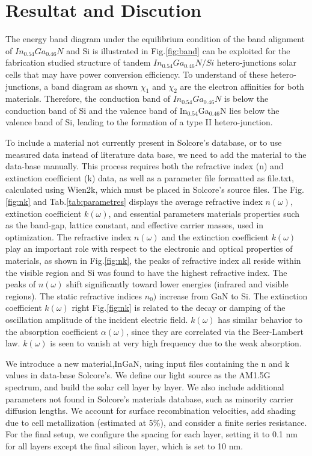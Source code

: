 \documentclass[preprint,12pt]{elsarticle}
\begin{document}
\section{Resultat and Discution} \label{sec:R_D}
The energy band diagram under the equilibrium condition of the band alignment of $In_{0.54}Ga_{0.46}N$ and Si is illustrated in Fig.\ref{fig:band} can be exploited for the fabrication studied structure of tandem $In_{0.54}Ga_{0.46}N/Si$ hetero-junctions solar cells that may have power conversion efficiency. To understand of these hetero-junctions, a band diagram as shown $ \chi_{1}$ and $ \chi_{2}$ are the electron affinities for both materials. Therefore, the conduction band of $In_{0.54}Ga_{0.46}N$ is below the conduction band of Si and the valence band of In$_{0.54}$Ga$_{0.46}$N lies below the valence band of Si, leading to the formation of a type II hetero-junction. 

To include a material not currently present in Solcore's database, or to use measured data instead of literature data base, we need to add the material to the data-base manually. This process requires both the refractive index (n) and extinction coefficient (k) data, as well as a parameter file formatted as file.txt, calculated using Wien2k, which must be placed in Solcore's source files. The Fig.\ref{fig:nk} and Tab.\ref{tab:parametres} displays the average refractive index $n(\omega)$, extinction coefficient $k(\omega)$, and essential parameters materials properties such as the band-gap, lattice constant, and effective carrier masses, used in optimization. The refractive index $n(\omega)$ and the extinction coefficient $k(\omega)$ play an important role with respect to the electronic and optical properties of materials, as shown in Fig.\ref{fig:nk}, the peaks of refractive index all reside within the visible region and Si was found to have the highest refractive index. The peaks of $n(\omega)$ shift significantly toward lower energies (infrared and visible regions). The static refractive indices $n_{0})$  increase from GaN to Si. The extinction coefficient $k(\omega)$ right Fig.\ref{fig:nk} is related to the decay or damping of the oscillation amplitude of the incident electric field. $k(\omega)$ has similar behavior to the absorption coefficient $\alpha (\omega)$, since they are correlated via the Beer-Lambert law. $k(\omega)$ is seen to vanish at very high frequency due to the weak absorption.


We introduce a new material,InGaN, using input files containing the n and k values in data-base Solcore's. We define our light source as the AM1.5G spectrum, and build the solar cell layer by layer. We also include additional parameters not found in Solcore’s materials database, such as minority carrier diffusion lengths. We account for surface recombination velocities, add shading due to cell metallization (estimated at 5\%), and consider a finite series resistance. For the final setup, we configure the spacing for each layer, setting it to 0.1 nm for all layers except the final silicon layer, which is set to 10 nm.
\end{document}
